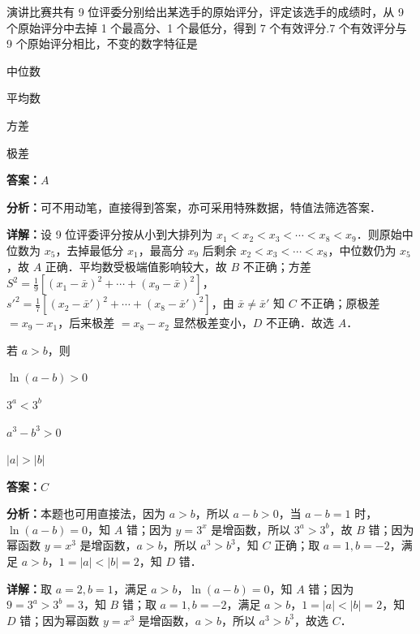 \begin{question}[points=5]
演讲比赛共有 9 位评委分别给出某选手的原始评分，评定该选手的成绩时，从 9 个原始评分中去掉 1 个最高分、1 个最低分，得到 7 个有效评分.7 个有效评分与 9 个原始评分相比，不变的数字特征是
\begin{choices}
  \item 中位数
  \item 平均数
  \item 方差
  \item 极差
\end{choices}
\begin{solution}
\textbf{答案：}$A$

\textbf{分析：}可不用动笔，直接得到答案，亦可采用特殊数据，特值法筛选答案．

\textbf{详解：}设 9 位评委评分按从小到大排列为 $x_1<x_2<x_3<\cdots<x_8<x_9$．则原始中位数为 $x_5$，去掉最低分 $x_1$，最高分 $x_9$ 后剩余 $x_2<x_3<\cdots<x_8$，中位数仍为 $x_5$，故 $A$ 正确．平均数受极端值影响较大，故 $B$ 不正确；方差 $S^2=\frac{1}{9}[(x_1-\bar{x})^2+\cdots+(x_9-\bar{x})^2]$，$s'^2=\frac{1}{7}[(x_2-\bar{x}')^2+\cdots+(x_8-\bar{x}')^2]$，由 $\bar{x}\neq\bar{x}'$ 知 $C$ 不正确；原极差 $=x_9-x_1$，后来极差 $=x_8-x_2$ 显然极差变小，$D$ 不正确．故选 $A$．
\end{solution}
\end{question}

\begin{question}[points=5]
若 $a>b$，则
\begin{choices}
  \item $\ln(a-b)>0$
  \item $3^a<3^b$
  \item $a^3-b^3>0$
  \item $|a|>|b|$
\end{choices}
\begin{solution}
\textbf{答案：}$C$

\textbf{分析：}本题也可用直接法，因为 $a>b$，所以 $a-b>0$，当 $a-b=1$ 时，$\ln(a-b)=0$，知 $A$ 错；因为 $y=3^x$ 是增函数，所以 $3^a>3^b$，故 $B$ 错；因为幂函数 $y=x^3$ 是增函数，$a>b$，所以 $a^3>b^3$，知 $C$ 正确；取 $a=1,b=-2$，满足 $a>b$，$1=|a|<|b|=2$，知 $D$ 错．

\textbf{详解：}取 $a=2,b=1$，满足 $a>b$，$\ln(a-b)=0$，知 $A$ 错；因为 $9=3^a>3^b=3$，知 $B$ 错；取 $a=1,b=-2$，满足 $a>b$，$1=|a|<|b|=2$，知 $D$ 错；因为幂函数 $y=x^3$ 是增函数，$a>b$，所以 $a^3>b^3$，故选 $C$．
\end{solution}
\end{question}

